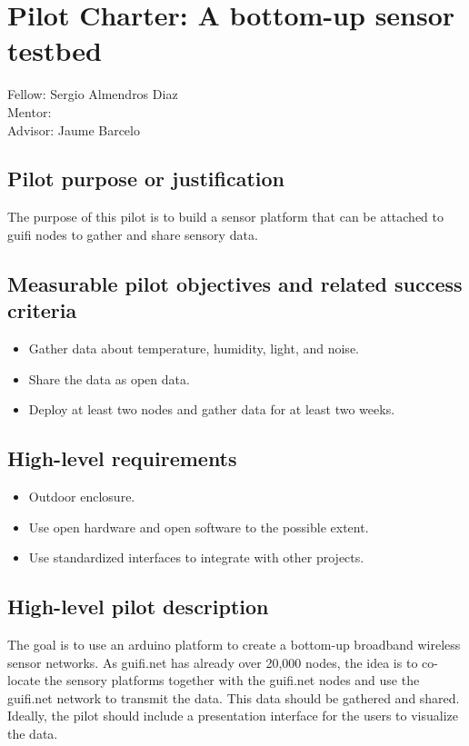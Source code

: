 \documentclass[10pt,a4paper]{article}
\begin{document}
\section{Pilot Charter: A bottom-up sensor testbed}
\label{sec:mnp}

Fellow: Sergio Almendros Diaz
\\
Mentor: 
\\
Advisor: Jaume Barcelo

\subsection{Pilot purpose or justification}
The purpose of this pilot is to build a sensor platform that can be attached to guifi nodes to gather and share sensory data.

\subsection{Measurable pilot objectives and related success criteria}
\begin{itemize}
\item Gather data about temperature, humidity, light, and noise. 
\item Share the data as open data.
\item Deploy at least two nodes and gather data for at least two weeks.
\end{itemize}

\subsection{High-level requirements}
\begin{itemize}
\item Outdoor enclosure.
\item Use open hardware and open software to the possible extent.
\item Use standardized interfaces to integrate with other projects.
\end{itemize}

\subsection{High-level pilot description}
The goal is to use an arduino platform to create a bottom-up broadband wireless sensor networks. 
As guifi.net has already over 20,000 nodes, the idea is to co-locate the sensory platforms together with the guifi.net nodes and use the guifi.net network to transmit the data.
This data should be gathered and shared.
Ideally, the pilot should include a presentation interface for the users to visualize the data.
\end{document}
